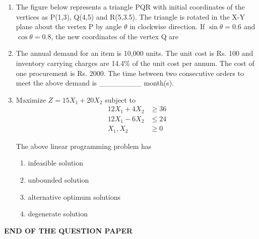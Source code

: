 \documentclass[journal,11pt,onecolumn]{IEEEtran}
\begin{document}
\begin{enumerate}[resume]
    \item The figure below represents a triangle PQR with initial coordinates of the vertices as P(1,3), Q(4,5) and R(5,3.5). The triangle is rotated in the X-Y plane about the vertex P by angle $\theta$ in clockwise direction. If $\sin \theta = 0.6$ and $\cos \theta = 0.8$, the new coordinates of the vertex Q are

          \begin{enumerate}


          \end{enumerate}

    \item The annual demand for an item is 10,000 units. The unit cost is Rs. 100 and inventory carrying charges are 14.4\% of the unit cost per annum. The cost of one procurement is Rs. 2000. The time between two consecutive orders to meet the above demand is \_\_\_\_\_\_\_\_ month(s).

    \item Maximize $Z=15X_1 + 20X_2$
          subject to
          \begin{align}
              12X_1 + 4X_2 & \geq 36 \\
              12X_1 - 6X_2 & \leq 24 \\
              X_1, X_2     & \geq 0
          \end{align}

          The above linear programming problem has

          \begin{enumerate}

              \item infeasible solution

              \item unbounded solution

              \item alternative optimum solutions

              \item degenerate solution

          \end{enumerate}

\end{enumerate}

\vspace{1cm}

\centering\Large\textbf{END OF THE QUESTION PAPER}
\end{document}
